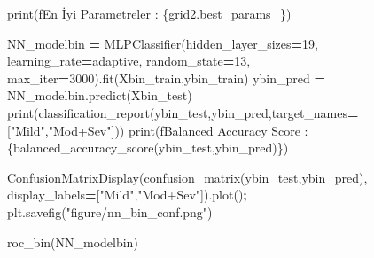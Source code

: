 \documentclass[12pt,twoside]{deuthesis}
\newenvironment{Shaded}{\begin{snugshade}}{\end{snugshade}}
\newcommand{\BuiltInTok}[1]{#1}
\newcommand{\DecValTok}[1]{\textcolor[rgb]{0.00,0.00,0.81}{#1}}
\newcommand{\NormalTok}[1]{#1}
\newcommand{\OperatorTok}[1]{\textcolor[rgb]{0.81,0.36,0.00}{\textbf{#1}}}
\newcommand{\SpecialCharTok}[1]{\textcolor[rgb]{0.00,0.00,0.00}{#1}}
\newcommand{\SpecialStringTok}[1]{\textcolor[rgb]{0.31,0.60,0.02}{#1}}
\newcommand{\StringTok}[1]{\textcolor[rgb]{0.31,0.60,0.02}{#1}}
\begin{document}
\begin{Shaded}
\begin{Highlighting}[]
\BuiltInTok{print}\NormalTok{(}\SpecialStringTok{f\textquotesingle{}En İyi Parametreler : }\SpecialCharTok{\{}\NormalTok{grid2}\SpecialCharTok{.}\NormalTok{best\_params\_}\SpecialCharTok{\}}\SpecialStringTok{\textquotesingle{}}\NormalTok{)}
\end{Highlighting}
\end{Shaded}
\begin{Shaded}
\begin{Highlighting}[]
\NormalTok{NN\_modelbin }\OperatorTok{=}\NormalTok{ MLPClassifier(hidden\_layer\_sizes}\OperatorTok{=}\DecValTok{19}\NormalTok{,}
\NormalTok{                            learning\_rate}\OperatorTok{=}\StringTok{\textquotesingle{}adaptive\textquotesingle{}}\NormalTok{,}
\NormalTok{                            random\_state}\OperatorTok{=}\DecValTok{13}\NormalTok{,}
\NormalTok{                            max\_iter}\OperatorTok{=}\DecValTok{3000}\NormalTok{).fit(Xbin\_train,ybin\_train)}
\NormalTok{ybin\_pred }\OperatorTok{=}\NormalTok{ NN\_modelbin.predict(Xbin\_test)}
\BuiltInTok{print}\NormalTok{(classification\_report(ybin\_test,ybin\_pred,target\_names}\OperatorTok{=}\NormalTok{[}\StringTok{"Mild"}\NormalTok{,}\StringTok{"Mod+Sev"}\NormalTok{]))}
\BuiltInTok{print}\NormalTok{(}\SpecialStringTok{f\textquotesingle{}Balanced Accuracy Score : }\SpecialCharTok{\{}\NormalTok{balanced\_accuracy\_score(ybin\_test,ybin\_pred)}\SpecialCharTok{\}}\SpecialStringTok{\textquotesingle{}}\NormalTok{)}
\end{Highlighting}
\end{Shaded}
\begin{Shaded}
\begin{Highlighting}[]
\NormalTok{ConfusionMatrixDisplay(confusion\_matrix(ybin\_test,ybin\_pred),}
\NormalTok{                       display\_labels}\OperatorTok{=}\NormalTok{[}\StringTok{"Mild"}\NormalTok{,}\StringTok{"Mod+Sev"}\NormalTok{]).plot()}\OperatorTok{;}
\NormalTok{plt.savefig(}\StringTok{"figure/nn\_bin\_conf.png"}\NormalTok{)}
\end{Highlighting}
\end{Shaded}
\begin{Shaded}
\begin{Highlighting}[]
\NormalTok{roc\_bin(NN\_modelbin)}
\end{Highlighting}
\end{Shaded}
\normalsize
\end{document}
